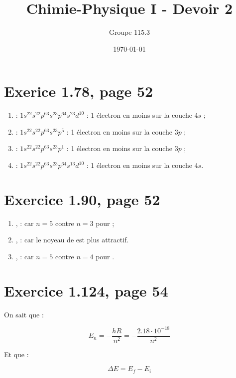 \documentclass{article}
\title{Chimie-Physique I - Devoir 2}
\author{Groupe 115.3}
\date{\today}
\begin{document}
\maketitle

\section{Exerice 1.78, page 52}

\begin{enumerate}
  \item {} : $1s^22s^22p^63s^23p^64s^23d^{10}$ : 1 électron en moins sur la couche $4s$ ;
  \item {} : $1s^22s^22p^63s^23p^5$ : 1 électron en moins sur la couche $3p$ ;
  \item {} : $1s^22s^22p^63s^23p^1$ : 1 électron en moins sur la couche $3p$ ;
  \item {} : $1s^22s^22p^63s^23p^64s^13d^{10}$ : 1 électron en moins sur la couche $4s$.
\end{enumerate}

\section{Exercice 1.90, page 52}

\begin{enumerate}
	\item {},  :  car $n = 5$ contre $n = 3$ pour  ;
	\item {},  :  car le noyeau de  est plus attractif.
	\item {},  :  car $n = 5$ contre $n = 4$ pour .
\end{enumerate}

\section{Exercice 1.124, page 54}

On sait que :

$$E_n = -\frac{hR}{n^2} = -\frac{2.18 \cdot 10^{-18}}{n^2}$$

Et que :

$$\Delta E = E_f - E_i$$
\end{document}
